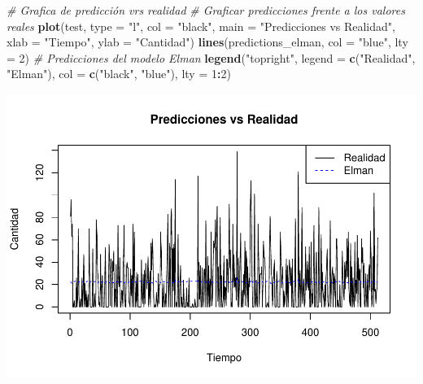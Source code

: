 \documentclass[
]{book}
\newenvironment{Shaded}{\begin{snugshade}}{\end{snugshade}}
\newcommand{\AttributeTok}[1]{\textcolor[rgb]{0.13,0.29,0.53}{#1}}
\newcommand{\CommentTok}[1]{\textcolor[rgb]{0.56,0.35,0.01}{\textit{#1}}}
\newcommand{\DecValTok}[1]{\textcolor[rgb]{0.00,0.00,0.81}{#1}}
\newcommand{\FunctionTok}[1]{\textcolor[rgb]{0.13,0.29,0.53}{\textbf{#1}}}
\newcommand{\NormalTok}[1]{#1}
\newcommand{\SpecialCharTok}[1]{\textcolor[rgb]{0.81,0.36,0.00}{\textbf{#1}}}
\newcommand{\StringTok}[1]{\textcolor[rgb]{0.31,0.60,0.02}{#1}}
\begin{document}
\begin{Shaded}
\begin{Highlighting}[]
\CommentTok{\# Grafica de predicción vrs realidad}
\CommentTok{\# Graficar predicciones frente a los valores reales}
\FunctionTok{plot}\NormalTok{(test, }\AttributeTok{type =} \StringTok{"l"}\NormalTok{, }\AttributeTok{col =} \StringTok{"black"}\NormalTok{, }\AttributeTok{main =} \StringTok{"Predicciones vs Realidad"}\NormalTok{, }\AttributeTok{xlab =} \StringTok{"Tiempo"}\NormalTok{, }\AttributeTok{ylab =} \StringTok{"Cantidad"}\NormalTok{)}
\FunctionTok{lines}\NormalTok{(predictions\_elman, }\AttributeTok{col =} \StringTok{"blue"}\NormalTok{, }\AttributeTok{lty =} \DecValTok{2}\NormalTok{)  }\CommentTok{\# Predicciones del modelo Elman}
\FunctionTok{legend}\NormalTok{(}\StringTok{"topright"}\NormalTok{, }\AttributeTok{legend =} \FunctionTok{c}\NormalTok{(}\StringTok{"Realidad"}\NormalTok{, }\StringTok{"Elman"}\NormalTok{), }\AttributeTok{col =} \FunctionTok{c}\NormalTok{(}\StringTok{"black"}\NormalTok{, }\StringTok{"blue"}\NormalTok{), }\AttributeTok{lty =} \DecValTok{1}\SpecialCharTok{:}\DecValTok{2}\NormalTok{)}
\end{Highlighting}
\end{Shaded}

\includegraphics{_main_files/figure-latex/unnamed-chunk-40-1.pdf}
\end{document}

